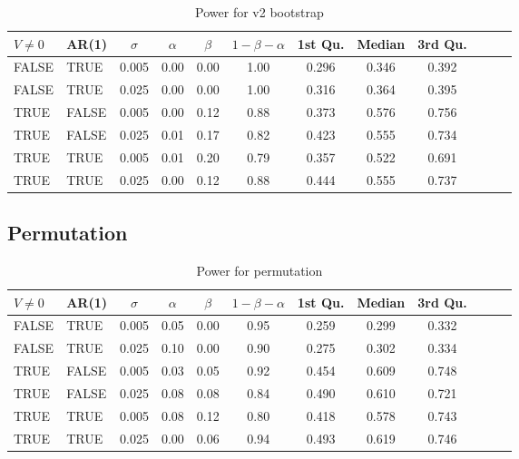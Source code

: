 \documentclass{article}
\begin{document}
\begin{table}[H]
\centering
\begin{tabular}{llcccccccccc}
  \hline
$V \not= 0$ & AR(1) & $\sigma$  & $\alpha$ & $\beta$ & $1 - \beta - \alpha$  & 1st Qu. & Median & 3rd Qu. \\ 
  \hline
FALSE & TRUE & 0.005 & 0.00 & 0.00 & 1.00 & 0.296 & 0.346 & 0.392 \\ 
  FALSE & TRUE & 0.025 & 0.00 & 0.00 & 1.00 & 0.316 & 0.364 & 0.395 \\ 
  TRUE & FALSE & 0.005 & 0.00 & 0.12 & 0.88 & 0.373 & 0.576 & 0.756 \\ 
  TRUE & FALSE & 0.025 & 0.01 & 0.17 & 0.82 & 0.423 & 0.555 & 0.734 \\ 
  TRUE & TRUE & 0.005 & 0.01 & 0.20 & 0.79 & 0.357 & 0.522 & 0.691 \\ 
  TRUE & TRUE & 0.025 & 0.00 & 0.12 & 0.88 & 0.444 & 0.555 & 0.737 \\ 
   \hline
\end{tabular}
\caption{Power for v2 bootstrap} 
\label{tab:good_boot_pwr}
\end{table}

\subsection{Permutation}

\begin{table}[H]
\centering
\begin{tabular}{llcccccccccc}
  \hline
$V \not= 0$ & AR(1) & $\sigma$  & $\alpha$ & $\beta$ & $1 - \beta - \alpha$  & 1st Qu. & Median & 3rd Qu.  \\ 
  \hline
FALSE & TRUE & 0.005 & 0.05 & 0.00 & 0.95 & 0.259 & 0.299 & 0.332 \\ 
  FALSE & TRUE & 0.025 & 0.10 & 0.00 & 0.90 & 0.275 & 0.302 & 0.334 \\ 
  TRUE & FALSE & 0.005 & 0.03 & 0.05 & 0.92 & 0.454 & 0.609 & 0.748 \\ 
  TRUE & FALSE & 0.025 & 0.08 & 0.08 & 0.84 & 0.490 & 0.610 & 0.721 \\ 
  TRUE & TRUE & 0.005 & 0.08 & 0.12 & 0.80 & 0.418 & 0.578 & 0.743 \\ 
  TRUE & TRUE & 0.025 & 0.00 & 0.06 & 0.94 & 0.493 & 0.619 & 0.746 \\ 
   \hline
\end{tabular}
\caption{Power for permutation} 
\label{tab:perm_pwr}
\end{table}
\end{document}
